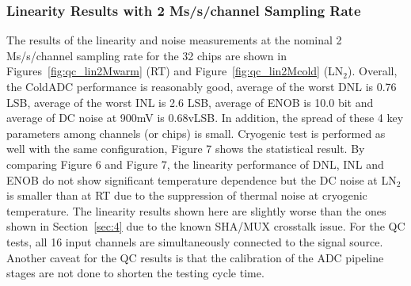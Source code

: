 \subsubsection{Linearity Results with 2 Ms/s/channel Sampling Rate}
The results of the linearity and noise measurements at the nominal 2 Ms/s/channel sampling rate for the 32 chips are shown in 
Figures~\ref{fig:qc_lin2Mwarm} (RT) and Figure~\ref{fig:qc_lin2Mcold} (LN$_2$). 
Overall, the ColdADC performance is reasonably good, average of the worst DNL is 0.76 LSB, average of the worst INL is 2.6 LSB, 
average of ENOB is 10.0 bit and average of DC noise at 900mV is 0.68vLSB. In addition, the spread of these 4 key parameters 
among channels (or chips) is small.
Cryogenic test is performed as well with the same configuration,  Figure 7 shows the statistical result. 
By comparing Figure 6 and Figure 7, the linearity  performance of DNL, INL and ENOB do not show significant temperature dependence
 but the DC noise at LN$_2$ is smaller than at RT due to the suppression of thermal noise at cryogenic temperature.  
The linearity results shown here are slightly worse than the ones shown in Section~\ref{sec:4} due to the known SHA/MUX crosstalk issue.
For the QC tests, all 16 input channels are simultaneously connected to the signal source.
Another caveat for the QC results is that the calibration of the ADC pipeline stages are not done to shorten the testing cycle time.

